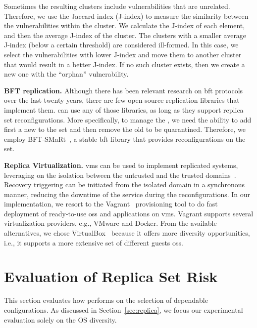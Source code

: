 Sometimes the resulting clusters include vulnerabilities that are unrelated. Therefore, we use the Jaccard index (J-index) to measure the similarity between the vulnerabilities within the cluster. We calculate the J-index of each element, and then the average J-index of the cluster. 
The clusters with a smaller average J-index (below a certain threshold) are considered ill-formed. In this case, we select the vulnerabilities with lower J-index and move them to another cluster that would result in a better J-index. If no such cluster exists, then we create a new one with the ``orphan'' vulnerability.

\textbf{BFT replication.}
Although there has been relevant research on \gls{bft} protocols over the last twenty years, there are few open-source replication libraries that implement them. \system can use any of those libraries, as long as they support replica set reconfigurations.
More specifically, to manage the \replicas, we need the ability to add first a new \replica to the set and then remove the old \replica to be quarantined. 
Therefore, we employ BFT-SMaRt~\cite{Bessani:2014}, a stable \gls{bft} library that provides reconfigurations on the \replicas set.

\textbf{Replica Virtualization.}
\glspl{vm} can be used to implement replicated systems, leveraging on the isolation between the untrusted and the trusted domains~\cite{Sousa:2010,Platania:2014,Distler:2011}.
Recovery triggering can be initiated from the isolated domain in a synchronous manner, reducing the downtime of the service during the reconfigurations. 
In our implementation, we resort to the Vagrant~\cite{vagrant} provisioning tool to do fast deployment of ready-to-use \glspl{os} and applications on \glspl{vm}. 
Vagrant supports several virtualization providers, e.g., VMware and Docker. 
From the available alternatives, we chose VirtualBox~\cite{virtualbox} because it offers more diversity opportunities, i.e., it supports a more extensive set of different guests \glspl{os}.


\section{Evaluation of Replica Set Risk}
\label{sec:diversity}

This section evaluates how \system performs on the selection of dependable \replica configurations.
As discussed in Section~\ref{sec:replica}, we focus our experimental evaluation solely on the OS diversity.


